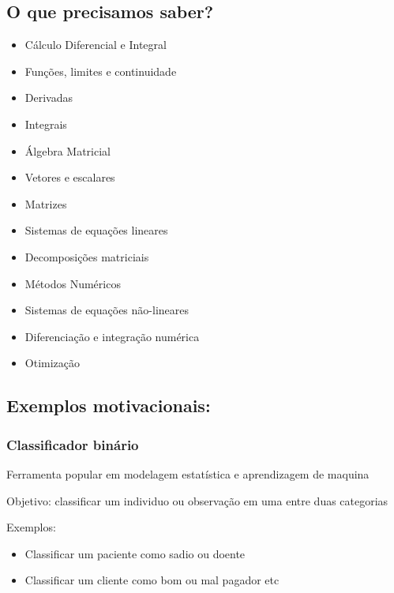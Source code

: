 \documentclass[
]{article}
\providecommand{\tightlist}{%
  \setlength{\itemsep}{0pt}\setlength{\parskip}{0pt}}
\begin{document}
\hypertarget{o-que-precisamos-saber}{%
\subsection{O que precisamos saber?}\label{o-que-precisamos-saber}}

\begin{itemize}
\tightlist
\item
  Cálculo Diferencial e Integral
\item
  Funções, limites e continuidade
\item
  Derivadas
\item
  Integrais
\item
  Álgebra Matricial
\item
  Vetores e escalares
\item
  Matrizes
\item
  Sistemas de equações lineares
\item
  Decomposições matriciais
\item
  Métodos Numéricos
\item
  Sistemas de equações não-lineares
\item
  Diferenciação e integração numérica
\item
  Otimização
\end{itemize}

\hypertarget{exemplos-motivacionais}{%
\subsection{Exemplos motivacionais:}\label{exemplos-motivacionais}}

\hypertarget{classificador-binuxe1rio}{%
\subsubsection{Classificador binário}\label{classificador-binuxe1rio}}

Ferramenta popular em modelagem estatística e aprendizagem de maquina

Objetivo: classificar um individuo ou observação em uma entre duas
categorias

Exemplos:

\begin{itemize}
\tightlist
\item
  Classificar um paciente como sadio ou doente
\item
  Classificar um cliente como bom ou mal pagador etc
\end{itemize}
\end{document}
